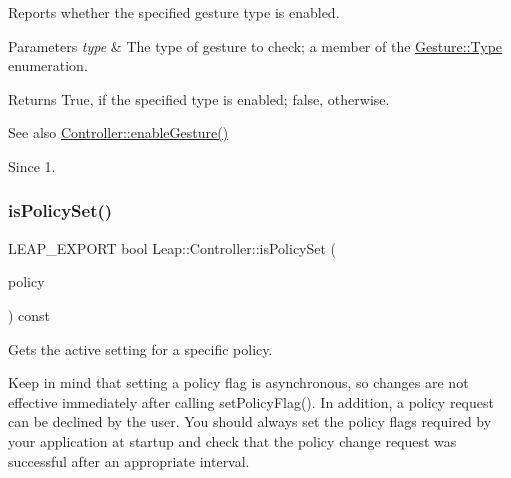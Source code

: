 Reports whether the specified gesture type is enabled.


\begin{DoxyCodeInclude}
\end{DoxyCodeInclude}



\begin{DoxyParams}{Parameters}
{\em type} & The type of gesture to check; a member of the \hyperlink{class_leap_1_1_gesture_a6fa6dd4f28c502f0d55abc6b71c6f9b1}{Gesture\+::\+Type} enumeration. \\
\hline
\end{DoxyParams}
\begin{DoxyReturn}{Returns}
True, if the specified type is enabled; false, otherwise. 
\end{DoxyReturn}
\begin{DoxySeeAlso}{See also}
\hyperlink{class_leap_1_1_controller_a3e7ee0e1418e1cee5274274d50f3a998}{Controller\+::enable\+Gesture()} 
\end{DoxySeeAlso}
\begin{DoxySince}{Since}
1. 
\end{DoxySince}
\mbox{\label{class_leap_1_1_controller_a75bfba23a30619a3514fa1d654b4df29}} 
\subsubsection{\texorpdfstring{is\+Policy\+Set()}{isPolicySet()}}
{\footnotesize\ttfamily L\+E\+A\+P\+\_\+\+E\+X\+P\+O\+RT bool Leap\+::\+Controller\+::is\+Policy\+Set (\begin{DoxyParamCaption}\item[{\hyperlink{class_leap_1_1_controller_a0bdb49fa94aa2da8b098c1ac296528d6}{Policy\+Flag}}]{policy }\end{DoxyParamCaption}) const}

Gets the active setting for a specific policy.

Keep in mind that setting a policy flag is asynchronous, so changes are not effective immediately after calling set\+Policy\+Flag(). In addition, a policy request can be declined by the user. You should always set the policy flags required by your application at startup and check that the policy change request was successful after an appropriate interval.

